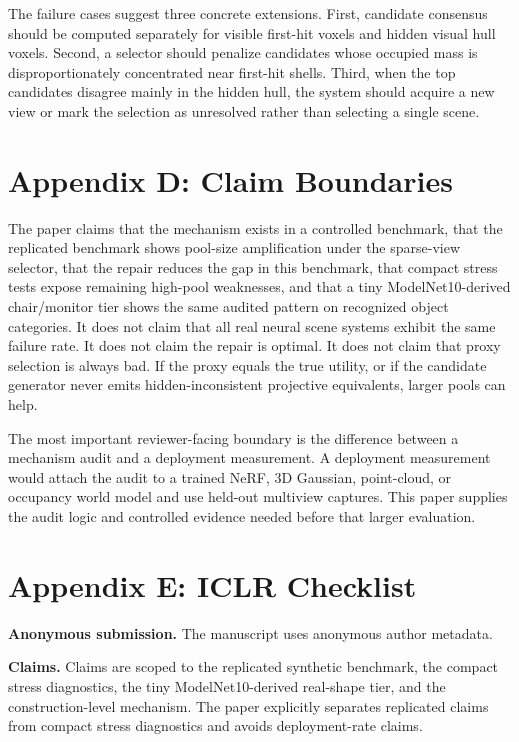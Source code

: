 \documentclass{article}
\begin{document}
The failure cases suggest three concrete extensions. First, candidate consensus
should be computed separately for visible first-hit voxels and hidden visual
hull voxels. Second, a selector should penalize candidates whose occupied mass
is disproportionately concentrated near first-hit shells. Third, when the top
candidates disagree mainly in the hidden hull, the system should acquire a new
view or mark the selection as unresolved rather than selecting a single scene.

\section{Appendix D: Claim Boundaries}

The paper claims that the mechanism exists in a controlled benchmark, that the
replicated benchmark shows pool-size amplification under the sparse-view
selector, that the repair reduces the gap in this benchmark, that compact
stress tests expose remaining high-pool weaknesses, and that a tiny
ModelNet10-derived chair/monitor tier shows the same audited pattern on
recognized object categories. It does not claim that all real neural scene
systems exhibit the same failure rate. It does not claim the repair is optimal.
It does not claim that proxy selection is always bad. If the proxy equals the
true utility, or if the candidate generator never emits hidden-inconsistent
projective equivalents, larger pools can help.

The most important reviewer-facing boundary is the difference between a
mechanism audit and a deployment measurement. A deployment measurement would
attach the audit to a trained NeRF, 3D Gaussian, point-cloud, or occupancy
world model and use held-out multiview captures. This paper supplies the audit
logic and controlled evidence needed before that larger evaluation.

\section{Appendix E: ICLR Checklist}

\textbf{Anonymous submission.} The manuscript uses anonymous author metadata.

\textbf{Claims.} Claims are scoped to the replicated synthetic benchmark, the
compact stress diagnostics, the tiny ModelNet10-derived real-shape tier, and
the construction-level mechanism. The paper explicitly separates replicated
claims from compact stress diagnostics and avoids deployment-rate claims.
\end{document}
